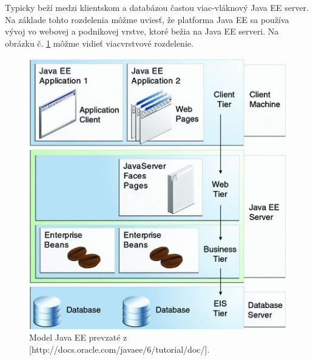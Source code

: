 Typicky beží medzi klientskom a databázou častou viac-vláknový Java EE server. Na základe tohto rozdelenia môžme uviesť, že platforma Java EE sa používa vývoj vo webovej a podnikovej vrstve, ktoré bežia na Java EE serveri.  Na obrázku č. \ref{model} môžme vidieť viacvrstvové rozdelenie.
\begin{figure}[htb]

\begin{center}

\includegraphics[scale=0.5]{model.jpg} 
\caption{Model Java EE prevzaté z [http://docs.oracle.com/javaee/6/tutorial/doc/].}
\label{model}

\end{center}

\end{figure}

